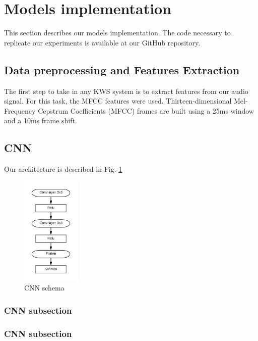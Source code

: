 \section{Models implementation}
\label{sec:models_implementation}

\noindent This section describes our models implementation. The code necessary to replicate our experiments is available at our GitHub repository. 
\subsection*{ \textbf {Data preprocessing and Features Extraction}} The first step to take in any KWS system is to extract features from our audio signal. For this task, the MFCC features were used. Thirteen-dimensional Mel-Frequency Cepstrum Coefficients (MFCC) frames are built using a 25ms window and a 10ms frame shift. 

\subsection{ \textbf {CNN}} Our architecture is described in Fig. \ref{fig:CNN_schema}

\begin{figure}[h]
	\centering
	    \includegraphics[width=0.25\textwidth]{CNN_schema}
	    \caption{CNN schema}
	    \label{fig:CNN_schema}
\end{figure}

\subsubsection{ \textbf {CNN subsection}} 
\subsubsection{ \textbf {CNN subsection}} 
